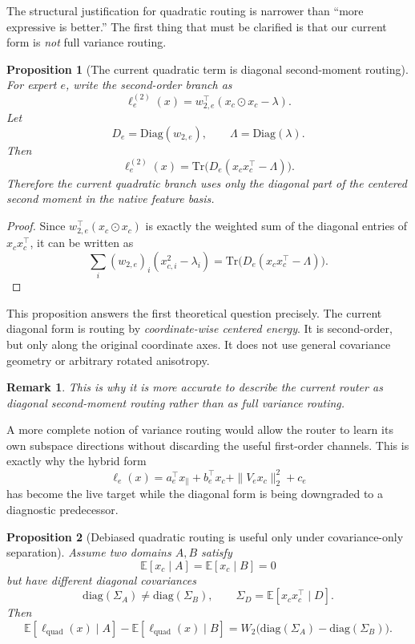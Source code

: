 \documentclass[11pt]{article}
\newtheorem{proposition}{Proposition}
\newtheorem{remark}{Remark}
\begin{document}
The structural justification for quadratic routing is narrower than ``more expressive is better.'' The first thing that must be clarified is that our current form is \emph{not} full variance routing.

\begin{proposition}[The current quadratic term is diagonal second-moment routing]
For expert $e$, write the second-order branch as
\[
\ell^{(2)}_e(x)
=
w_{2,e}^{\top}(x_c\odot x_c-\lambda).
\]
Let
\[
D_e=\mathrm{Diag}(w_{2,e}),
\qquad
\Lambda=\mathrm{Diag}(\lambda).
\]
Then
\[
\ell^{(2)}_e(x)
=
\mathrm{Tr}\!\big(D_e(x_cx_c^{\top}-\Lambda)\big).
\]
Therefore the current quadratic branch uses only the diagonal part of the centered second moment in the native feature basis.
\end{proposition}

\begin{proof}
Since $w_{2,e}^{\top}(x_c\odot x_c)$ is exactly the weighted sum of the diagonal entries of $x_cx_c^{\top}$, it can be written as
\[
\sum_i (w_{2,e})_i (x_{c,i}^2-\lambda_i)
=
\mathrm{Tr}\!\big(D_e(x_cx_c^\top-\Lambda)\big).
\]
\end{proof}

This proposition answers the first theoretical question precisely. The current diagonal form is routing by \emph{coordinate-wise centered energy}. It is second-order, but only along the original coordinate axes. It does not use general covariance geometry or arbitrary rotated anisotropy.

\begin{remark}
This is why it is more accurate to describe the current router as \emph{diagonal second-moment routing} rather than as full variance routing.
\end{remark}

A more complete notion of variance routing would allow the router to learn its own subspace directions without discarding the useful first-order channels. This is exactly why the hybrid form
\[
\ell_e(x)
=
a_e^\top x_{\parallel}
+
b_e^\top x_c
+
\|V_e x_c\|_2^2
+
c_e
\]
has become the live target while the diagonal form is being downgraded to a diagnostic predecessor.

\begin{proposition}[Debiased quadratic routing is useful only under covariance-only separation]
Assume two domains $A,B$ satisfy
\[
\mathbb{E}[x_c\mid A]=\mathbb{E}[x_c\mid B]=0
\]
but have different diagonal covariances
\[
\mathrm{diag}(\Sigma_A)\neq \mathrm{diag}(\Sigma_B),
\qquad
\Sigma_D=\mathbb{E}[x_cx_c^\top\mid D].
\]
Then
\[
\mathbb{E}[\ell_{\mathrm{quad}}(x)\mid A]-\mathbb{E}[\ell_{\mathrm{quad}}(x)\mid B]
=
W_2\big(\mathrm{diag}(\Sigma_A)-\mathrm{diag}(\Sigma_B)\big).
\]
\end{proposition}
\end{document}
